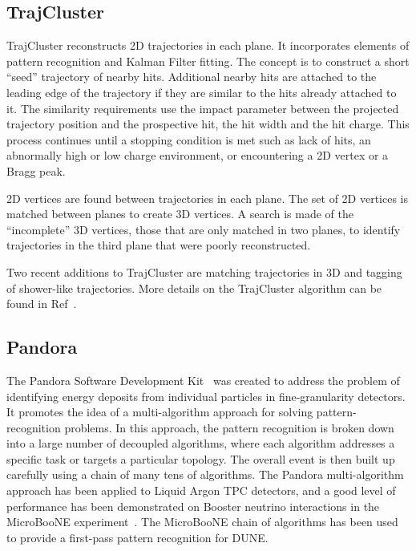 \subsection{TrajCluster}\label{sec:TrajCluster}
TrajCluster reconstructs 2D trajectories in each plane. It incorporates elements of pattern recognition and Kalman Filter fitting. The concept is to construct a short ``seed'' trajectory of nearby hits. Additional nearby hits are attached to the leading edge of the trajectory if they are similar to the hits already attached to it. The similarity requirements use the impact parameter between the projected trajectory position and the prospective hit, the hit width and the hit charge. This process continues until a stopping condition is met such as lack of hits, an abnormally high or low charge environment, or encountering a 2D vertex or a Bragg peak.

2D vertices are found between trajectories in each plane. The set of 2D vertices is matched between planes to create 3D vertices. A search is made of the ``incomplete'' 3D vertices, those that are only matched in two planes, to identify trajectories in the third plane that were poorly reconstructed.

Two recent additions to TrajCluster are matching trajectories in 3D and tagging of shower-like trajectories. More details on the TrajCluster algorithm can be found in Ref~\cite{ref:trajcluster}.



\subsection{Pandora}\label{sec:Pandora}

The Pandora Software Development Kit~\cite{Marshall:2015rfa} was created to address the problem of identifying energy deposits from individual particles in fine-granularity detectors. It promotes the idea of a multi-algorithm approach for solving pattern-recognition problems. In this approach, the pattern recognition is broken down into a large number of decoupled algorithms, where each algorithm addresses a specific task or targets a particular topology. The overall event is then built up carefully using a chain of many tens of algorithms. The Pandora multi-algorithm approach has been applied to Liquid Argon TPC detectors, and a good level of performance has been demonstrated on Booster neutrino interactions in the MicroBooNE experiment~\cite{ref:PandoraPublicNote}. The MicroBooNE chain of algorithms has been used to provide a first-pass pattern recognition for DUNE.


